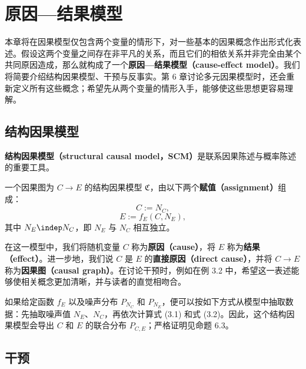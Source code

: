 \chapter{原因—结果模型}
\label{ch:cause-effect-models}

本章将在因果模型仅包含两个变量的情形下，对一些基本的因果概念作出形式化表述。假设这两个变量之间存在非平凡的关系，而且它们的相依关系并非完全由某个共同原因造成，那么就构成了一个\textbf{原因—结果模型（cause-effect model）}。我们将简要介绍结构因果模型、干预与反事实。第 6 章讨论多元因果模型时，还会重新定义所有这些概念；希望先从两个变量的情形入手，能够使这些思想更容易理解。

\section{结构因果模型}
\label{sec:ch03-scm}

\textbf{结构因果模型（structural causal model，SCM）}是联系因果陈述与概率陈述的重要工具。

\begin{definition}[结构因果模型]
一个因果图为 $C\to E$ 的结构因果模型 $\mathfrak{C}$，由以下两个\textbf{赋值（assignment）}组成：
\begin{equation}
 C:=N_C,
 \tag{3.1}
\end{equation}
\begin{equation}
 E:=f_E(C,N_E),
 \tag{3.2}
\end{equation}
其中 $N_E\indep N_C$，即 $N_E$ 与 $N_C$ 相互独立。
\end{definition}

在这一模型中，我们将随机变量 $C$ 称为\textbf{原因（cause）}，将 $E$ 称为\textbf{结果（effect）}。进一步地，我们说 $C$ 是 $E$ 的\textbf{直接原因（direct cause）}，并将 $C\to E$ 称为\textbf{因果图（causal graph）}。在讨论干预时，例如在例 3.2 中，希望这一表述能够使相关概念更加清晰，并与读者的直觉相吻合。

如果给定函数 $f_E$ 以及噪声分布 $P_{N_C}$ 和 $P_{N_E}$，便可以按如下方式从模型中抽取数据：先抽取噪声值 $N_E$、$N_C$，再依次计算式 (3.1) 和式 (3.2)。因此，这个结构因果模型会导出 $C$ 和 $E$ 的联合分布 $P_{C,E}$；严格证明见命题 6.3。

\section{干预}
\label{sec:ch03-interventions}

